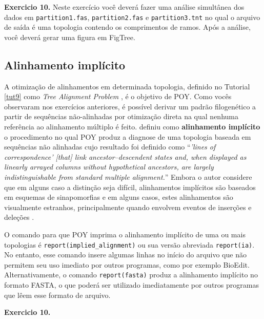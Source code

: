 \begin{refsection}
\begin{blackBlock}{\textbf{Exercicio 10.}}
Neste exercício você deverá fazer uma análise simultânea dos dados em \texttt{partition1.fas}, \texttt{partition2.fas} e \texttt{partition3.tnt} no qual o arquivo de saída é uma topologia contendo os comprimentos de ramos. Após a análise, você deverá gerar uma figura em FigTree.

\end{blackBlock}

\subsection{Alinhamento implícito}\label{tut10:sa:ia}

A otimização de alinhamentos em determinada topologia, definido no Tutorial \ref{tut9} como \textit{Tree Alignment Problem} \parencite[\textbf{TAP}; ][]{Sankoff_1975}, é o objetivo de POY. Como vocês observaram nos exercícios anteriores, é possível derivar um padrão filogenético a partir de sequências não-alinhadas por otimização direta na qual nenhuma referência ao alinhamento múltiplo é feito. \textcite{Wheeler_2003a} definiu como \textbf{alinhamento implícito} o procedimento no qual POY produz a diagnose de uma topologia baseada em sequências não alinhadas cujo resultado foi definido como ``\textit{'lines of correspondence' [that] link ancestor–descendent states and, when displayed as linearly arrayed columns without hypothetical ancestors, are largely indistinguishable from standard multiple alignment.}'' Embora o autor considere que em alguns caso a distinção seja difícil, alinhamentos implícitos são baseados em esquemas de sinapomorfias e em alguns casos, estes alinhamentos são visualmente estranhos, principalmente quando envolvem eventos de inserções e deleções \parencite[consulte][]{Wheeler_2003a}. 

O comando para que POY imprima o alinhamento implícito de uma ou mais topologias é \texttt{report(implied\_alignment)} ou sua versão abreviada \texttt{report(ia)}. No entanto, esse comando insere algumas linhas no início do arquivo que não permitem seu uso imediato por outros programas, como por exemplo BioEdit. Alternativamente, o comando \texttt{report(fasta)} produz a alinhamento implícito no formato FASTA, o que poderá ser utilizado imediatamente por outros programas que lêem esse formato de arquivo.\\

\begin{blackBlock}{\textbf{Exercicio 10.}}\label{tut10:ex:10.3}


\end{blackBlock}
\end{refsection}
